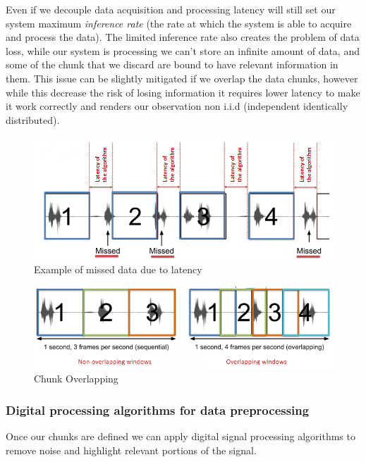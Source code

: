 \documentclass{article}
\begin{document}
        Even if we decouple data acquisition and processing latency will still set our system maximum \emph{inference rate} (the rate at which the system is able to acquire and process the data). The limited inference rate also creates the problem of data loss, while our system is processing we can't store an infinite amount of data, and some
        of the chunk that we discard are bound to have relevant information in them. This issue can be slightly mitigated if we overlap the data chunks, however while this decrease the risk of losing information it requires lower latency to make it work correctly and renders our observation non i.i.d (independent identically distributed).
        \begin{figure}[H]
          \includegraphics[scale=0.55]{../Images/Missing_data.png}
          \centering
          \caption{Example of missed data due to latency}
        \end{figure}

        \begin{figure}[H]
          \includegraphics[scale=0.6]{../Images/Chunk_overlap.png}
          \centering
          \caption{Chunk Overlapping}
        \end{figure}
      \subsubsection{Digital processing algorithms for data preprocessing}
        Once our chunks are defined we can apply digital signal processing algorithms to remove noise and highlight
        relevant portions of the signal.
\end{document}
